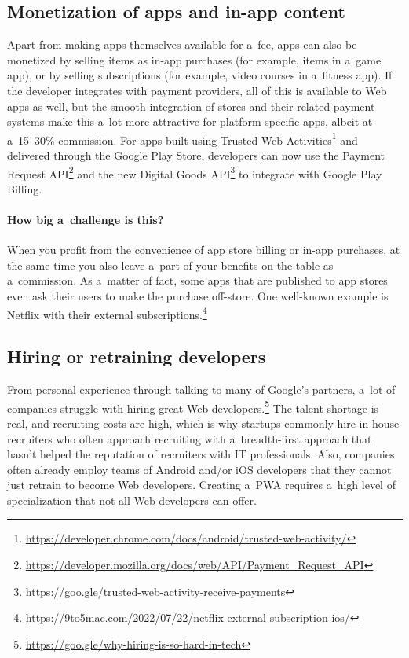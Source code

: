 \documentclass[sigconf]{acmart}
\begin{document}
\subsection{Monetization of apps and in-app content}

Apart from making apps themselves available for a~fee, apps can also be monetized by selling items as in-app purchases (for example, items in a~game app), or by selling subscriptions (for example, video courses in a~fitness app). If the developer integrates with payment providers, all of this is available to Web apps as well, but the smooth integration of stores and their related payment systems make this a~lot more attractive for platform-specific apps, albeit at a~15--30\% commission. For apps built using Trusted Web Activities\footnote{\url{https://developer.chrome.com/docs/android/trusted-web-activity/}} and delivered through the Google Play Store, developers can now use the Payment Request API\footnote{\url{https://developer.mozilla.org/docs/web/API/Payment_Request_API}} and the new Digital Goods API\footnote{\url{https://goo.gle/trusted-web-activity-receive-payments}} to integrate with Google Play Billing.

\paragraph{How big a~challenge is this?}

When you profit from the convenience of app store billing or in-app purchases, at the same time you also leave a~part of your benefits on the table as a~commission. As a~matter of fact, some apps that are published to app stores even ask their users to make the purchase off-store. One well-known example is Netflix with their external subscriptions.\footnote{\url{https://9to5mac.com/2022/07/22/netflix-external-subscription-ios/}}

\subsection{Hiring or retraining developers}

From personal experience through talking to many of Google's partners, a~lot of companies struggle with hiring great Web developers.\footnote{\url{https://goo.gle/why-hiring-is-so-hard-in-tech}} The talent shortage is real, and recruiting costs are high, which is why startups commonly hire in-house recruiters who often approach recruiting with a~breadth-first approach that hasn't helped the reputation of recruiters with IT professionals. Also, companies often already employ teams of Android and/or iOS developers that they cannot just retrain to become Web developers. Creating a~PWA requires a~high level of specialization that not all Web developers can offer.
\end{document}

